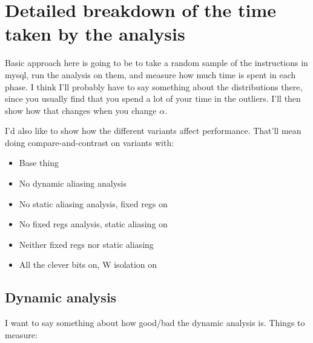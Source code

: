 


\section{Detailed breakdown of the time taken by the analysis}
\label{sect:eval:time_details}

Basic approach here is going to be to take a random sample of the
instructions in mysql, run the analysis on them, and measure how much
time is spent in each phase.  I think I'll probably have to say
something about the distributions there, since you usually find that
you spend a lot of your time in the outliers.  I'll then show how that
changes when you change $\alpha$.

I'd also like to show how the different variants affect performance.
That'll mean doing compare-and-contrast on variants with:

\begin{itemize}
\item Base thing
\item No dynamic aliasing analysis
\item No static aliasing analysis, fixed regs on
\item No fixed regs analysis, static aliasing on
\item Neither fixed regs nor static aliasing
\item All the clever bits on, W isolation on
\end{itemize}

\subsection{Dynamic analysis}

I want to say something about how good/bad the dynamic analysis is.
Things to measure:

